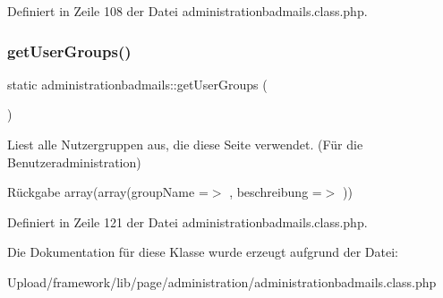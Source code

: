Definiert in Zeile 108 der Datei administrationbadmails.\+class.\+php.

\mbox{\label{classadministrationbadmails_acdcd56418bf825ffcd500d40fcf8eec4}} 
\subsubsection{\texorpdfstring{get\+User\+Groups()}{getUserGroups()}}
{\footnotesize\ttfamily static administrationbadmails\+::get\+User\+Groups (\begin{DoxyParamCaption}{ }\end{DoxyParamCaption})\hspace{0.3cm}{\ttfamily [static]}}

Liest alle Nutzergruppen aus, die diese Seite verwendet. (Für die Benutzeradministration) \begin{DoxyReturn}{Rückgabe}
array(array(\textquotesingle{}group\+Name\textquotesingle{} =$>$ \textquotesingle{}\textquotesingle{}, \textquotesingle{}beschreibung\textquotesingle{} =$>$ \textquotesingle{}\textquotesingle{})) 
\end{DoxyReturn}


Definiert in Zeile 121 der Datei administrationbadmails.\+class.\+php.



Die Dokumentation für diese Klasse wurde erzeugt aufgrund der Datei\+:\begin{DoxyCompactItemize}
\item 
Upload/framework/lib/page/administration/administrationbadmails.\+class.\+php\end{DoxyCompactItemize}
